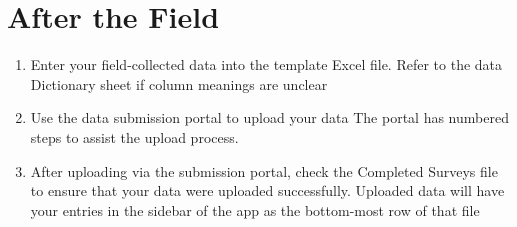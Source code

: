 \documentclass[
  letterpaper,
  DIV=11,
  numbers=noendperiod]{scrreprt}
\begin{document}
\section{After the Field}\label{after-the-field}

\begin{enumerate}
\def\labelenumi{\arabic{enumi}.}
\item
  Enter your field-collected data into the template Excel file. Refer to
  the data Dictionary sheet if column meanings are unclear
\item
  Use the data submission portal to upload your data The portal has
  numbered steps to assist the upload process.
\item
  After uploading via the submission portal, check the Completed Surveys
  file to ensure that your data were uploaded successfully. Uploaded
  data will have your entries in the sidebar of the app as the
  bottom-most row of that file
\end{enumerate}
\end{document}
